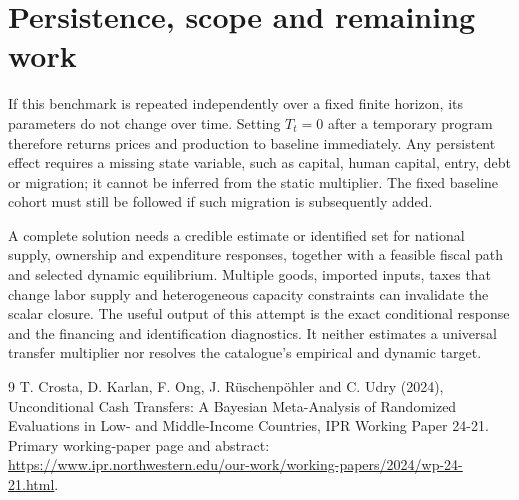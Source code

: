 \documentclass[11pt]{article}
\begin{document}
\section*{Persistence, scope and remaining work}
If this benchmark is repeated independently over a fixed finite horizon, its parameters do not change over time. Setting $T_t=0$ after a temporary program therefore returns prices and production to baseline immediately. Any persistent effect requires a missing state variable, such as capital, human capital, entry, debt or migration; it cannot be inferred from the static multiplier. The fixed baseline cohort must still be followed if such migration is subsequently added.

A complete solution needs a credible estimate or identified set for national supply, ownership and expenditure responses, together with a feasible fiscal path and selected dynamic equilibrium. Multiple goods, imported inputs, taxes that change labor supply and heterogeneous capacity constraints can invalidate the scalar closure. The useful output of this attempt is the exact conditional response and the financing and identification diagnostics. It neither estimates a universal transfer multiplier nor resolves the catalogue's empirical and dynamic target.

\begin{thebibliography}{9}
 T. Crosta, D. Karlan, F. Ong, J. R\"uschenp\"ohler and C. Udry (2024), Unconditional Cash Transfers: A Bayesian Meta-Analysis of Randomized Evaluations in Low- and Middle-Income Countries, IPR Working Paper 24-21. Primary working-paper page and abstract:
\url{https://www.ipr.northwestern.edu/our-work/working-papers/2024/wp-24-21.html}.
\end{thebibliography}
\end{document}

